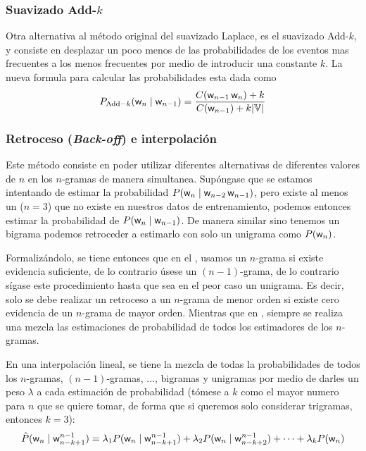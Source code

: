 \subsubsection{Suavizado Add-$k$}
Otra alternativa al método original del suavizado Laplace, es el suavizado Add-$k$, y consiste en desplazar un poco menos de las probabilidades de los eventos mas frecuentes a los menos frecuentes por medio de introducir una constante $k$. La nueva formula para calcular las probabilidades esta dada como
\begin{equation} \label{eq:add-k-smoothing}
  P_{\mathrm{Add-}k}({\mathit{\mathsf{w}}}_n \mid {\mathit{\mathsf{w}}}_{n-1}) = \frac{C({\mathit{\mathsf{w}}}_{n-1} \, {\mathit{\mathsf{w}}}_n) +k}{C({\mathit{\mathsf{w}}}_{n-1}) + k |{\mathbb{V}}|}
\end{equation}

\subsubsection{Retroceso (\textsl{Back-off}) e interpolación}
Este método consiste en poder utilizar diferentes alternativas de diferentes valores de $n$ en los $n$-gramas de manera simultanea. Supóngase que se estamos intentando de estimar la probabilidad $P({\mathit{\mathsf{w}}}_n \mid {\mathit{\mathsf{w}}}_{n-2} \, {\mathit{\mathsf{w}}}_{n-1})$, pero existe al menos un  ($n=3$) que no existe en nuestros datos de entrenamiento, podemos entonces estimar la probabilidad de $P({\mathit{\mathsf{w}}}_n \mid {\mathit{\mathsf{w}}}_{n-1})$. De manera similar sino tenemos un bigrama podemos retroceder a estimarlo con solo un unigrama como $P({\mathit{\mathsf{w}}}_n)$.

Formalizándolo, se tiene entonces que en el , usamos un $n$-grama si existe evidencia suficiente, de lo contrario úsese un $(n-1)$-grama, de lo contrario sígase este procedimiento hasta que sea en el peor caso un unigrama. Es decir, solo se debe realizar un retroceso a un $n$-grama de menor orden si existe cero evidencia de un $n$-grama de mayor orden. Mientras que en , siempre se realiza una mezcla las estimaciones de probabilidad de todos los estimadores de los $n$-gramas.

En una interpolación lineal, se tiene la mezcla de todas la probabilidades de todos los $n$-gramas, $(n-1)$-gramas, ..., bigramas y unigramas por medio de darles un peso $\lambda$ a cada estimación de probabilidad (tómese a $k$ como el mayor numero para $n$ que se quiere tomar, de forma que si queremos solo considerar trigramas, entonces $k=3$):
\begin{equation}
  \hat{P}({\mathit{\mathsf{w}}}_n \mid {\mathit{\mathsf{w}}}_{n-k+1}^{n-1}) = \lambda_1 P({\mathit{\mathsf{w}}}_n \mid {\mathit{\mathsf{w}}}_{n-k+1}^{n-1}) + \lambda_2 P({\mathit{\mathsf{w}}}_n \mid {\mathit{\mathsf{w}}}_{n-k+2}^{n-1}) + \cdots + \lambda_k P({\mathit{\mathsf{w}}}_n)
\end{equation}

